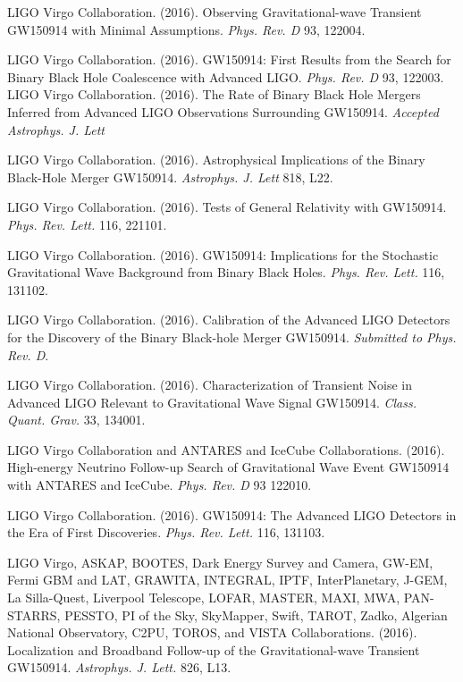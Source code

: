   LIGO Virgo Collaboration. (2016). Observing Gravitational-wave Transient GW150914 with Minimal Assumptions. {\em Phys. Rev. D} 93, 122004.

  LIGO Virgo Collaboration. (2016). GW150914: First Results from the Search for Binary Black Hole Coalescence with Advanced LIGO. {\em Phys. Rev. D} 93, 122003.
  LIGO Virgo Collaboration. (2016). The Rate of Binary Black Hole Mergers Inferred from Advanced LIGO Observations Surrounding GW150914. {\em Accepted Astrophys. J. Lett}

  LIGO Virgo Collaboration. (2016). Astrophysical Implications of the Binary Black-Hole Merger GW150914. {\em Astrophys. J. Lett} 818, L22.

  LIGO Virgo Collaboration. (2016). Tests of General Relativity with GW150914. {\em Phys. Rev. Lett.} 116, 221101.
  
  LIGO Virgo Collaboration. (2016). GW150914: Implications for the Stochastic Gravitational Wave Background from Binary Black Holes. {\em Phys. Rev. Lett.} 116, 131102.

  LIGO Virgo Collaboration. (2016). Calibration of the Advanced LIGO Detectors for the Discovery of the Binary Black-hole Merger GW150914. {\em Submitted to Phys. Rev. D}.

  LIGO Virgo Collaboration. (2016). Characterization of Transient Noise in Advanced LIGO Relevant to Gravitational Wave Signal GW150914. {\em Class. Quant. Grav.} 33, 134001.

  LIGO Virgo Collaboration and ANTARES and IceCube Collaborations. (2016). High-energy Neutrino Follow-up Search of Gravitational Wave Event GW150914 with ANTARES and IceCube. {\em Phys. Rev. D} 93 122010. 

  LIGO Virgo Collaboration. (2016). GW150914: The Advanced LIGO Detectors in the Era of First Discoveries. {\em Phys. Rev. Lett.} 116, 131103.

  LIGO Virgo, ASKAP, BOOTES, Dark Energy Survey and Camera, GW-EM, Fermi GBM and LAT, GRAWITA, INTEGRAL, IPTF, InterPlanetary, J-GEM, La Silla-Quest, Liverpool Telescope, LOFAR, MASTER, MAXI, MWA, PAN-STARRS, PESSTO, PI of the Sky, SkyMapper, Swift, TAROT, Zadko, Algerian National Observatory, C2PU, TOROS, and VISTA Collaborations. (2016). Localization and Broadband Follow-up of the Gravitational-wave Transient GW150914. {\em Astrophys. J. Lett.} 826, L13.
  
